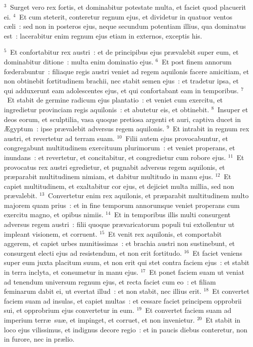 ${}^{3}$~Surget vero rex fortis, et dominabitur potestate multa, et faciet quod placuerit ei.
${}^{4}$~Et cum steterit, conteretur regnum ejus, et dividetur in quatuor ventos c\ae li~: sed non in posteros ejus, neque secundum potentiam illius, qua dominatus est~: lacerabitur enim regnum ejus etiam in externos, exceptis his.


${}^{5}$~Et confortabitur rex austri~: et de principibus ejus pr\ae valebit super eum, et dominabitur ditione~: multa enim dominatio ejus.
${}^{6}$~Et post finem annorum fœderabuntur~: filiaque regis austri veniet ad regem aquilonis facere amicitiam, et non obtinebit fortitudinem brachii, nec stabit semen ejus~: et tradetur ipsa, et qui adduxerunt eam adolescentes ejus, et qui confortabant eam in temporibus.
${}^{7}$~Et stabit de germine radicum ejus plantatio~: et veniet cum exercitu, et ingredietur provinciam regis aquilonis~: et abutetur eis, et obtinebit.
${}^{8}$~Insuper et deos eorum, et sculptilia, vasa quoque pretiosa argenti et auri, captiva ducet in \AE gyptum~: ipse pr\ae valebit adversus regem aquilonis.
${}^{9}$~Et intrabit in regnum rex austri, et revertetur ad terram suam.
${}^{10}$~Filii autem ejus provocabuntur, et congregabunt multitudinem exercituum plurimorum~: et veniet properans, et inundans~: et revertetur, et concitabitur, et congredietur cum robore ejus.
${}^{11}$~Et provocatus rex austri egredietur, et pugnabit adversus regem aquilonis, et pr\ae parabit multitudinem nimiam, et dabitur multitudo in manu ejus.
${}^{12}$~Et capiet multitudinem, et exaltabitur cor ejus, et dejiciet multa millia, sed non pr\ae valebit.
${}^{13}$~Convertetur enim rex aquilonis, et pr\ae parabit multitudinem multo majorem quam prius~: et in fine temporum annorumque veniet properans cum exercitu magno, et opibus nimiis.
${}^{14}$~Et in temporibus illis multi consurgent adversus regem austri~: filii quoque pr\ae varicatorum populi tui extollentur ut impleant visionem, et corruent.
${}^{15}$~Et venit rex aquilonis, et comportabit aggerem, et capiet urbes munitissimas~: et brachia austri non sustinebunt, et consurgent electi ejus ad resistendum, et non erit fortitudo.
${}^{16}$~Et faciet veniens super eum juxta placitum suum, et non erit qui stet contra faciem ejus~: et stabit in terra inclyta, et consumetur in manu ejus.
${}^{17}$~Et ponet faciem suam ut veniat ad tenendum universum regnum ejus, et recta faciet cum eo~: et filiam feminarum dabit ei, ut evertat illud~: et non stabit, nec illius erit.
${}^{18}$~Et convertet faciem suam ad insulas, et capiet multas~: et cessare faciet principem opprobrii sui, et opprobrium ejus convertetur in eum.
${}^{19}$~Et convertet faciem suam ad imperium terr\ae\ su\ae , et impinget, et corruet, et non invenietur.
${}^{20}$~Et stabit in loco ejus vilissimus, et indignus decore regio~: et in paucis diebus conteretur, non in furore, nec in pr\ae lio.


